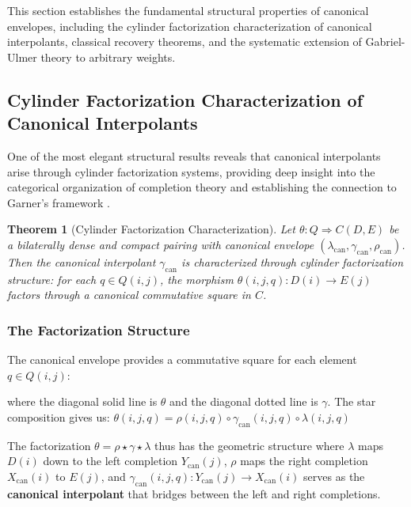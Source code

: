 \documentclass[11pt]{article}
\theoremstyle{plain}
\newtheorem{theorem}{Theorem}[section]
\theoremstyle{definition}
\theoremstyle{remark}
\begin{document}
This section establishes the fundamental structural properties of canonical envelopes, including the cylinder factorization characterization of canonical interpolants, classical recovery theorems, and the systematic extension of Gabriel-Ulmer theory to arbitrary weights.

\subsection{Cylinder Factorization Characterization of Canonical Interpolants}

One of the most elegant structural results reveals that canonical interpolants arise through cylinder factorization systems, providing deep insight into the categorical organization of completion theory and establishing the connection to Garner's framework \cite{garner2018cylinder}.

\begin{theorem}[Cylinder Factorization Characterization]
Let $\theta : Q \Rightarrow C(D, E)$ be a bilaterally dense and compact pairing with canonical envelope $(\lambda_{\mathrm{can}}, \gamma_{\mathrm{can}}, \rho_{\mathrm{can}})$. Then the canonical interpolant $\gamma_{\mathrm{can}}$ is characterized through cylinder factorization structure: for each $q \in Q(i,j)$, the morphism $\theta(i,j,q) : D(i) \to E(j)$ factors through a canonical commutative square in $C$.
\end{theorem}

\subsubsection{The Factorization Structure}

The canonical envelope provides a commutative square for each element $q \in Q(i,j)$:
\begin{center}
\end{center}

where the diagonal solid line is $\theta$ and the diagonal dotted line is $\gamma$. The star composition gives us:
$\theta(i,j,q) = \rho(i,j,q) \circ \gamma_{\mathrm{can}}(i,j,q) \circ \lambda(i,j,q)$

The factorization $\theta = \rho \star \gamma \star \lambda$ thus has the geometric structure where $\lambda$ maps $D(i)$ down to the left completion $Y_{\mathrm{can}}(j)$, $\rho$ maps the right completion $X_{\mathrm{can}}(i)$ to $E(j)$, and $\gamma_{\mathrm{can}}(i,j,q) : Y_{\mathrm{can}}(j) \to X_{\mathrm{can}}(i)$ serves as the \textbf{canonical interpolant} that bridges between the left and right completions.
\end{document}
